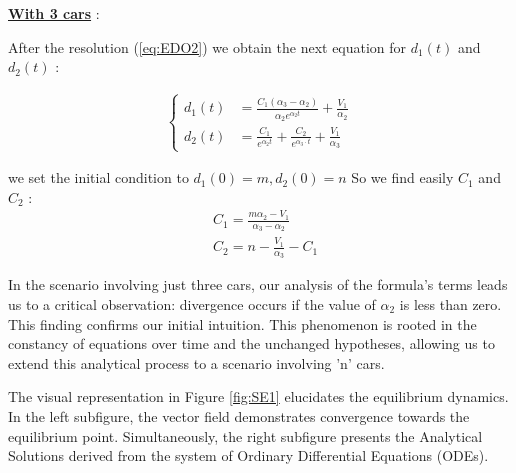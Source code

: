\documentclass{article}
\begin{document}
		\textbf{\underline{With 3 cars}} : \newline\newline
		
		After the resolution (\ref{eq:EDO2}) we obtain the next equation for $d_1(t)$ and $d_2(t)$ : 
		
		\begin{align*}
			\begin{cases}
				d_1(t) &= \frac{C_1(\alpha_3-\alpha_2)}{\alpha_2e^{\alpha_2t}}+ \frac{V_1}{\alpha_2}\\
				d_2(t) &= \frac{C_1}{e^{\alpha_2t}} + \frac{C_2}{e^{\alpha_3 \cdot t}} + \frac{V_1}{\alpha_3}
			\end{cases}
		\end{align*}
		
		we set the initial condition to $d_1(0)=m, d_2(0)=n$ So we find easily $C_1$ and $C_2$ : 
		\begin{align*}
			&C_1=\frac{m\alpha_2-V_1}{\alpha_3-\alpha_2} \\
			&C_2=n-\frac{V_1}{\alpha_3} - C_1
		\end{align*}
		
		In the scenario involving just three cars, our analysis of the formula's terms leads us to a critical observation: divergence occurs if the value of $\alpha_2$ is less than zero. This finding confirms our initial intuition. This phenomenon is rooted in the constancy of equations over time and the unchanged hypotheses, allowing us to extend this analytical process to a scenario involving 'n' cars.
		
		The visual representation in Figure \ref{fig:SE1} elucidates the equilibrium dynamics. In the left subfigure, the vector field demonstrates convergence towards the equilibrium point. Simultaneously, the right subfigure presents the Analytical Solutions derived from the system of Ordinary Differential Equations (ODEs).
		
\end{document}
